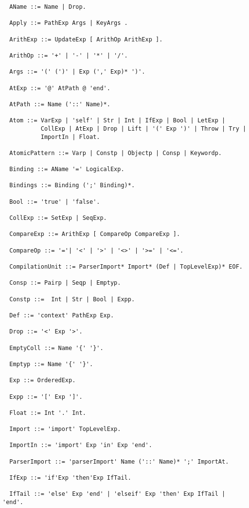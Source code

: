 \documentclass{article}
\begin{document}
\small
\begin{verbatim}
  AName ::= Name | Drop. 

  Apply ::= PathExp Args | KeyArgs .

  ArithExp ::= UpdateExp [ ArithOp ArithExp ].

  ArithOp ::= '+' | '-' | '*' | '/'.

  Args ::= '(' (')' | Exp (',' Exp)* ')'.

  AtExp ::= '@' AtPath @ 'end'.

  AtPath ::= Name ('::' Name)*.

  Atom ::= VarExp | 'self' | Str | Int | IfExp | Bool | LetExp | 
           CollExp | AtExp | Drop | Lift | '(' Exp ')' | Throw | Try | 
           ImportIn | Float.

  AtomicPattern ::= Varp | Constp | Objectp | Consp | Keywordp.
    
  Binding ::= AName '=' LogicalExp.

  Bindings ::= Binding (';' Binding)*.

  Bool ::= 'true' | 'false'.

  CollExp ::= SetExp | SeqExp. 

  CompareExp ::= ArithExp [ CompareOp CompareExp ].

  CompareOp ::= '='| '<' | '>' | '<>' | '>=' | '<='. 

  CompilationUnit ::= ParserImport* Import* (Def | TopLevelExp)* EOF.
  
  Consp ::= Pairp | Seqp | Emptyp.

  Constp ::=  Int | Str | Bool | Expp.

  Def ::= 'context' PathExp Exp. 
 
  Drop ::= '<' Exp '>'. 

  EmptyColl ::= Name '{' '}'.

  Emptyp ::= Name '{' '}'.

  Exp ::= OrderedExp.
    
  Expp ::= '[' Exp ']'.
    
  Float ::= Int '.' Int.

  Import ::= 'import' TopLevelExp.

  ImportIn ::= 'import' Exp 'in' Exp 'end'.

  ParserImport ::= 'parserImport' Name ('::' Name)* ';' ImportAt.

  IfExp ::= 'if'Exp 'then'Exp IfTail.

  IfTail ::= 'else' Exp 'end' | 'elseif' Exp 'then' Exp IfTail | 'end'.


\end{verbatim}
\end{document}
